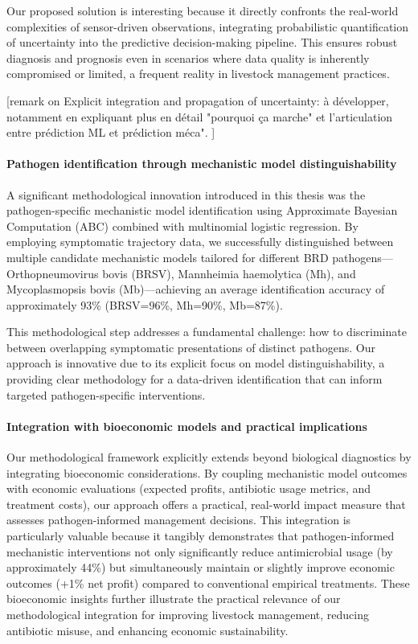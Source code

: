 Our proposed solution is interesting because it directly confronts the real-world complexities of sensor-driven observations, integrating probabilistic quantification of uncertainty into the predictive decision-making pipeline. This ensures robust diagnosis and prognosis even in scenarios where data quality is inherently compromised or limited, a frequent reality in livestock management practices.

[remark on Explicit integration and propagation of uncertainty: à développer, notamment en expliquant plus en détail "pourquoi ça marche" et l'articulation entre prédiction ML et prédiction méca". ]

\paragraph{Pathogen identification through mechanistic model distinguishability} A significant methodological innovation introduced in this thesis was the pathogen-specific mechanistic model identification using Approximate Bayesian Computation (ABC) combined with multinomial logistic regression. By employing symptomatic trajectory data, we successfully distinguished between multiple candidate mechanistic models tailored for different BRD pathogens—Orthopneumovirus bovis (BRSV), Mannheimia haemolytica (Mh), and Mycoplasmopsis bovis (Mb)—achieving an average identification accuracy of approximately 93\% (BRSV=96\%, Mh=90\%, Mb=87\%).

This methodological step addresses a fundamental challenge: how to discriminate between overlapping symptomatic presentations of distinct pathogens. Our approach is innovative due to its explicit focus on model distinguishability, a providing clear methodology for a data-driven identification that can inform targeted pathogen-specific interventions.

\paragraph{Integration with bioeconomic models and practical implications} Our methodological framework explicitly extends beyond biological diagnostics by integrating bioeconomic considerations. By coupling mechanistic model outcomes with economic evaluations (expected profits, antibiotic usage metrics, and treatment costs), our approach offers a practical, real-world impact measure that assesses pathogen-informed management decisions. This integration is particularly valuable because it tangibly demonstrates that pathogen-informed mechanistic interventions not only significantly reduce antimicrobial usage (by approximately 44\%) but simultaneously maintain or slightly improve economic outcomes (+1\% net profit) compared to conventional empirical treatments. These bioeconomic insights further illustrate the practical relevance of our methodological integration for improving livestock management, reducing antibiotic misuse, and enhancing economic sustainability.


